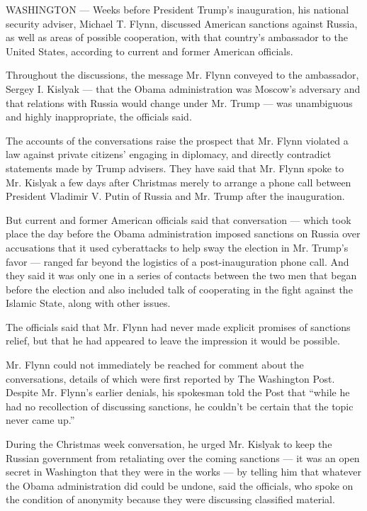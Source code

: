 WASHINGTON --- Weeks before President Trump's inauguration, his national
security adviser, Michael T. Flynn, discussed American sanctions against
Russia, as well as areas of possible cooperation, with that country's
ambassador to the United States, according to current and former
American officials.

Throughout the discussions, the message Mr. Flynn conveyed to the
ambassador, Sergey I. Kislyak --- that the Obama administration was
Moscow's adversary and that relations with Russia would change under Mr.
Trump --- was unambiguous and highly inappropriate, the officials said.

The accounts of the conversations raise the prospect that Mr. Flynn
violated a law against private citizens' engaging in diplomacy, and
directly contradict statements made by Trump advisers. They have said
that Mr. Flynn spoke to Mr. Kislyak a few days after Christmas merely to
arrange a phone call between President Vladimir V. Putin of Russia and
Mr. Trump after the inauguration.

But current and former American officials said that conversation ---
which took place the day before the Obama administration imposed
sanctions on Russia over accusations that it used cyberattacks to help
sway the election in Mr. Trump's favor --- ranged far beyond the
logistics of a post-inauguration phone call. And they said it was only
one in a series of contacts between the two men that began before the
election and also included talk of cooperating in the fight against the
Islamic State, along with other issues.

The officials said that Mr. Flynn had never made explicit promises of
sanctions relief, but that he had appeared to leave the impression it
would be possible.

Mr. Flynn could not immediately be reached for comment about the
conversations, details of which were first reported by The Washington
Post. Despite Mr. Flynn's earlier denials, his spokesman told the Post
that ``while he had no recollection of discussing sanctions, he couldn't
be certain that the topic never came up.''

During the Christmas week conversation, he urged Mr. Kislyak to keep the
Russian government from retaliating over the coming sanctions --- it was
an open secret in Washington that they were in the works --- by telling
him that whatever the Obama administration did could be undone, said the
officials, who spoke on the condition of anonymity because they were
discussing classified material.

